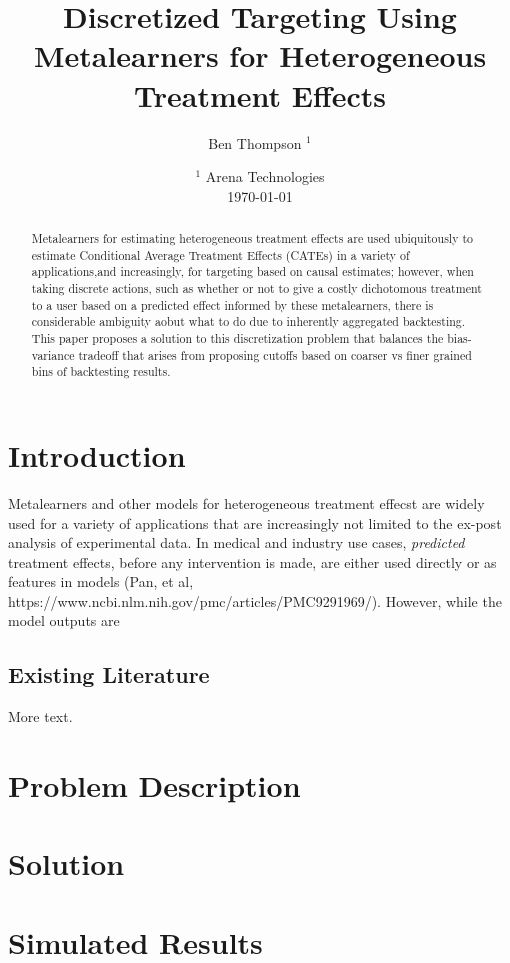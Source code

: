 \documentclass[11pt]{article} %
\title{Discretized Targeting Using Metalearners for Heterogeneous Treatment Effects}
\author{Ben Thompson $^1$}
\date{$^1$ Arena Technologies \\
	\today }
\begin{document}
\maketitle
\begin{abstract}
Metalearners for estimating heterogeneous treatment effects are used ubiquitously to estimate 
Conditional Average Treatment Effects (CATEs) in a variety of applications,and increasingly, for targeting 
based on causal estimates; however, when taking discrete actions, such as whether or not to give a 
costly dichotomous treatment to a user based on a predicted effect informed by these metalearners, 
there is considerable ambiguity aobut what to do due to inherently aggregated backtesting. 
This paper proposes a solution to this discretization problem that balances the bias-variance 
tradeoff that arises from proposing cutoffs based on coarser vs finer grained bins of backtesting
results.
\end{abstract}

\section{Introduction}

Metalearners and other models for heterogeneous treatment effecst are widely used for a variety of 
applications that are increasingly not limited to the ex-post analysis of experimental data. 
In medical and industry use cases, \textit{predicted} treatment effects, before any 
intervention is made, are either used directly or as features in models 
(Pan, et al, https://www.ncbi.nlm.nih.gov/pmc/articles/PMC9291969/). However, while the model outputs are 

\subsection{Existing Literature}

More text.

\section{Problem Description}

\section{Solution}

\section{Simulated Results}
\end{document}
